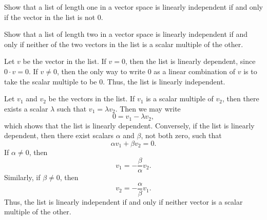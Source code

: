 \begin{exc}
\begin{exercise}\leavevmode
\begin{parts}
\item Show that a list of length one in a vector space is linearly independent
  if and only if the vector in the list is not $0$.
\item Show that a list of length two in a vector space is linearly independent
  if and only if neither of the two vectors in the list is a scalar multiple of
  the other.
\end{parts}
\end{exercise}
\begin{solution}\leavevmode
\begin{parts}
\item Let $v$ be the vector in the list. If $v=0$, then the list is linearly
  dependent, since $0\cdot v=0$. If $v\ne0$, then the only way to write $0$ as
  a linear combination of $v$ is to take the scalar multiple to be $0$. Thus,
  the list is linearly independent.
\item Let $v_1$ and $v_2$ be the vectors in the list. If $v_1$ is a scalar
  multiple of $v_2$, then there exists a scalar $\lambda$ such that
  $v_1=\lambda v_2$. Then we may write
  \[ 0 = v_1-\lambda v_2, \]
  which shows that the list is linearly dependent. Conversely, if the list is
  linearly dependent, then there exist scalars $\alpha$ and $\beta$, not both
  zero, such that
  \[ \alpha v_1+\beta v_2 = 0. \]
  If $\alpha\ne0$, then
  \[ v_1 = -\frac{\beta}{\alpha}v_2. \]
  Similarly, if $\beta\ne0$, then
  \[ v_2 = -\frac{\alpha}{\beta}v_1. \]
  Thus, the list is linearly independent if and only if neither vector is a
  scalar multiple of the other.
\end{parts}
\end{solution}


\end{exc}
